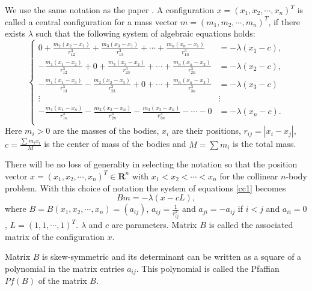 \documentclass[11pt,leqno]{article}
\theoremstyle{definition}
\theoremstyle{remark}
\numberwithin{equation}{section}
\begin{document}
We use the same notation as the paper \cite{ZX6}. A configuration $x=(x_1, x_2, \cdots, x_n)^T$ is called a central configuration for a mass vector  $m=(m_1, m_2, \cdots, m_n)^T$, if there exists $\lambda$ such that the following system of algebraic equations holds:
\begin{equation}\label{cc1}
 \left\{ \begin{array}{ll}
 0+\frac{m_2(x_2-x_1)}{r_{12}^3}+\frac{m_3(x_3-x_1)}{r_{13}^3}+\cdots+\frac{m_n(x_n-x_1)}{r_{1n}^3} &= -\lambda(x_1-c),\\
  -\frac{m_1(x_1-x_2)}{r_{12}^3}+0+\frac{m_3(x_3-x_2)}{r_{23}^3}+\cdots+\frac{m_n(x_n-x_2)}{r_{2n}^3} &= -\lambda(x_2-c),\\
  -\frac{m_1(x_1-x_3)}{r_{13}^3}-\frac{m_2(x_2-x_3)}{r_{23}^3}+0+\cdots+\frac{m_n(x_n-x_3)}{r_{3n}^3} &= -\lambda(x_3-c)\\
  \vdots  & \vdots\\
   -\frac{m_1(x_1-x_n)}{r_{1n}^3}-\frac{m_2(x_2-x_n)}{r_{2n}^3}-\frac{m_3(x_3-x_n)}{r_{3n}^3} -\cdots-0 &= -\lambda(x_n-c).\\

   \end{array} \right.
\end{equation}
Here $m_i>0$ are the masses of the bodies, $x_i$ are their positions, $r_{ij}=|x_i-x_j|$, $c=\frac{\sum m_ix_i}{M}$ is the center of mass of the bodies and $M=\sum m_i$ is the total mass. 

There will be no loss of generality in selecting the notation so that the position vector $x=(x_1, x_2, \cdots, x_n)^T\in \mathbf{R}^n$ with $x_1<x_2<\cdots <x_n$ for the collinear $n$-body problem. With this choice of notation the system of equations \eqref{cc1} becomes
\begin{equation}\label{cc2}
Bm=-\lambda(x-cL),
\end{equation}
where $B=B(x_1,x_2,\cdots,x_n)=(a_{ij})$, $a_{ij}=\frac{1}{r_{ij}^2}$ and $a_{ji}=-a_{ij}$ if $i<j$ and $a_{ii}=0$, $L=(1,1,\cdots,1)^T$. $\lambda$ and $c$ are parameters. Matrix $B$ is called the associated matrix of the configuration $x$. %

Matrix $B$ is skew-symmetric and its determinant can be written as a square of a polynomial in the matrix entries $a_{ij}$. This polynomial is called the Pfaffian $Pf(B)$ of the matrix $B$.  
\end{document}
